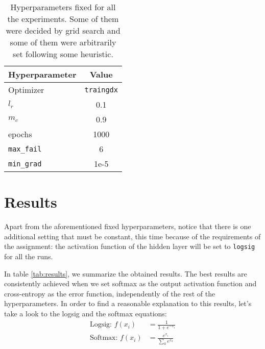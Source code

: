 \documentclass{article}[11pt]
\begin{document}
\begin{table}[h!]
  \begin{center}
    
    
    \begin{tabular}{l|c} 
      Hyperparameter & Value \\
      \hline
      Optimizer & \texttt{traingdx}\\
      $l_r$ & 0.1\\
      $m_c$ & 0.9\\
      epochs &  1000\\
    \texttt{max\_fail} & 6\\
    \texttt{min\_grad} & 1e-5 \\
    \end{tabular}
    \caption{Hyperparameters fixed for all the experiments. Some of them were decided by grid search and some of them were arbitrarily set following some heuristic.}
    \label{tab:hyperparams}
  \end{center}
\end{table}
\section{Results}

Apart from the aforementioned fixed hyperparameters, notice that there is one additional setting that must be constant, this time because of the requirements of the assignment: the activation function of the hidden layer will be set to \texttt{logsig} for all the runs.

In table \ref{tab:results}, we summarize the obtained results. The best results are consistently achieved when we set softmax as the output activation function and cross-entropy as the error function, independently of the rest of the hyperparameters. In order to find a reasonable explanation to this results, let's take a look to the logsig and the softmax equations:
\begin{align*}
    \textrm{Logsig: } f(x_i) &= \frac{1}{1+e^{-x_i}} \\
    \textrm{Softmax: } f(x_i) &= \frac{e^{x_i}}{\sum_k {e^{x_k}}}
\end{align*}
\end{document}
